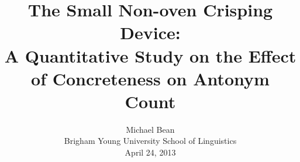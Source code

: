 \title{The Small Non-oven Crisping Device:\\
A Quantitative Study on the Effect of Concreteness on Antonym Count}

\renewcommand{\today}{April 24, 2013}
\author{Michael Bean\\
Brigham Young University School of Linguistics\\
\today}
\maketitle
